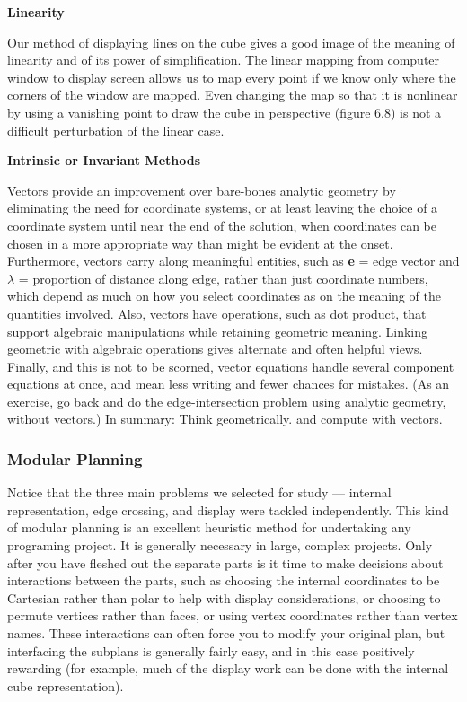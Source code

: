 \documentclass{book}
\begin{document}
\textbf{Linearity}

Our method of displaying lines on the cube gives a good image of
the meaning of linearity and of its power of simplification. The linear
mapping from computer window to display screen allows us to map every
point if we know only where the corners of the window are mapped. Even
changing the map so that it is nonlinear by using a vanishing point to
draw the cube in perspective (figure 6.8) is not a difficult perturbation
of the linear case.

\textbf{Intrinsic or Invariant Methods}

Vectors provide an improvement over bare-bones analytic geometry by
eliminating the need for coordinate systems, or at least leaving the choice
of a coordinate system until near the end of the solution, when coordinates can be chosen in a more appropriate way than might be evident
at the onset. Furthermore, vectors carry along meaningful entities, such
as \textbf{e} = edge vector and $\lambda$ = proportion of distance along edge, rather
than just coordinate numbers, which depend as much on how you select
coordinates as on the meaning of the quantities involved. Also, vectors
have operations, such as dot product, that support algebraic manipulations while retaining geometric meaning. Linking geometric with algebraic operations gives alternate and often helpful views. Finally, and
this is not to be scorned, vector equations handle several component
equations at once, and mean less writing and fewer chances for mistakes.
(As an exercise, go back and do the edge-intersection problem using
analytic geometry, without vectors.) In summary: Think geometrically.
and compute with vectors.

\subsubsection{Modular Planning}

Notice that the three main problems we selected for study --- internal
representation, edge crossing, and display were tackled independently.
This kind of modular planning is an excellent heuristic method for
undertaking any programing project. It is generally necessary in large,
complex projects. Only after you have fleshed out the separate parts
is it time to make decisions about interactions between the parts, such
as choosing the internal coordinates to be Cartesian rather than polar
to help with display considerations, or choosing to permute vertices
rather than faces, or using vertex coordinates rather than vertex names.
These interactions can often force you to modify your original plan,
but interfacing the subplans is generally fairly easy, and in this case
positively rewarding (for example, much of the display work can be done
with the internal cube representation).
\end{document}
